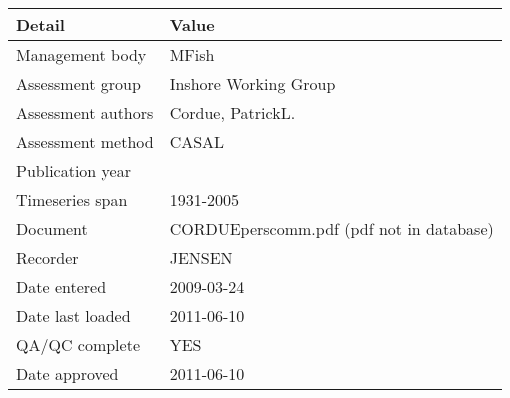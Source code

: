 \begin{table}[htb]
\centering
\begin{tabular}{ll}
\toprule
Detail & Value \\
\midrule
Management body    & MFish                                    \\
Assessment group   & Inshore Working Group                    \\
Assessment authors & Cordue, PatrickL.                        \\
Assessment method  & CASAL                                    \\
Publication year   &                                          \\
Timeseries span    & 1931-2005                                \\
Document           & CORDUEperscomm.pdf (pdf not in database) \\
Recorder           & JENSEN                                   \\
Date entered       & 2009-03-24                               \\
Date last loaded   & 2011-06-10                               \\
QA/QC complete     & YES                                      \\
Date approved      & 2011-06-10                               \\
\bottomrule
\end{tabular}
\label{tab:assessdet}
\end{table}

